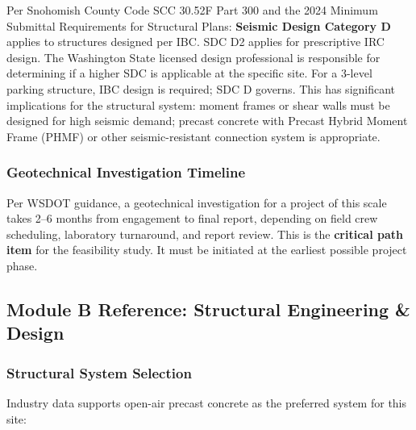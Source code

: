 \documentclass[11pt,letterpaper]{article}
\begin{document}
Per Snohomish County Code SCC 30.52F Part 300 and the 2024 Minimum Submittal Requirements for Structural Plans: \textbf{Seismic Design Category D} applies to structures designed per IBC. SDC D2 applies for prescriptive IRC design. The Washington State licensed design professional is responsible for determining if a higher SDC is applicable at the specific site. For a 3-level parking structure, IBC design is required; SDC D governs. This has significant implications for the structural system: moment frames or shear walls must be designed for high seismic demand; precast concrete with Precast Hybrid Moment Frame (PHMF) or other seismic-resistant connection system is appropriate.

\subsubsection{Geotechnical Investigation Timeline}

Per WSDOT guidance, a geotechnical investigation for a project of this scale takes 2--6 months from engagement to final report, depending on field crew scheduling, laboratory turnaround, and report review. This is the \textbf{critical path item} for the feasibility study. It must be initiated at the earliest possible project phase.

\subsection{Module B Reference: Structural Engineering \& Design}

\subsubsection{Structural System Selection}

Industry data supports open-air precast concrete as the preferred system for this site:
\end{document}

